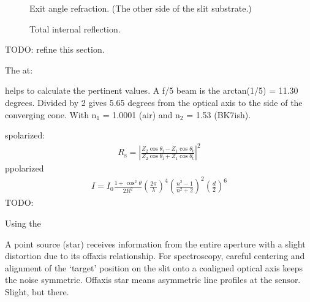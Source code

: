\documentclass[letterpaper,10pt,english,openany,oneside]{sphinxmanual}
\begin{document}
\begin{figure}[htbp]
\centering
\capstart

\noindent{}
\caption{Exit angle refraction. (The other side of the slit substrate.)}\label{\detokenize{physics:id5}}\end{figure}

\begin{figure}[htbp]
\centering
\capstart

\noindent{}
\caption{Total internal reflection.}\label{\detokenize{physics:id6}}\end{figure}

\sphinxAtStartPar
TODO: refine this section.

\sphinxAtStartPar
The  at:

\sphinxAtStartPar
helps to calculate the pertinent values. A f/5 beam is the arctan(1/5)
= 11.30 degrees. Divided by 2 gives 5.65 degrees \textendash{} from the optical
axis to the side of the converging cone. With n$_{\text{1}}$ =
1.0001 (air) and n$_{\text{2}}$ = 1.53 (BK7\sphinxhyphen{}ish).

\sphinxAtStartPar
s\sphinxhyphen{}polarized:
\begin{equation*}
\begin{split}R_\mathrm{s} = \left|\frac{Z_2 \cos \theta_\mathrm{i} - Z_1 \cos \theta_\mathrm{t}}{Z_2 \cos \theta_\mathrm{i} + Z_1 \cos \theta_\mathrm{t}}\right|^2\end{split}
\end{equation*}
\sphinxAtStartPar
p\sphinxhyphen{}polarized
\begin{equation*}
\begin{split}I = I_0 \frac{ 1+\cos^2 \theta }{2 R^2} \left( \frac{ 2 \pi }{ \lambda } \right)^4 \left( \frac{ n^2-1}{ n^2+2 } \right)^2 \left( \frac{d}{2} \right)^6\end{split}
\end{equation*}
\sphinxAtStartPar
TODO: 

\sphinxAtStartPar
Using the 

\sphinxAtStartPar
A point source (star) receives information from the entire aperture with
a slight distortion due to its off\sphinxhyphen{}axis relationship. For spectroscopy,
careful centering and alignment of the ‘target’ position on the slit
onto a co\sphinxhyphen{}aligned optical axis keeps the noise symmetric. Off\sphinxhyphen{}axis
star means asymmetric line profiles at the sensor. Slight, but there.
\end{document}
